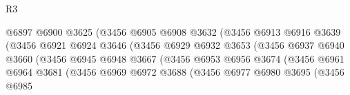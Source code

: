 \begin{lexlean}{R3}
\begin{coremodule}
                                          @6897
                                          @6900
                                          @3625
                                          (@3456
                                            @6905
                                            @6908
                                            @3632
                                            (@3456
                                              @6913
                                              @6916
                                              @3639
                                              (@3456
                                                @6921
                                                @6924
                                                @3646
                                                (@3456
                                                  @6929
                                                  @6932
                                                  @3653
                                                  (@3456
                                                    @6937
                                                    @6940
                                                    @3660
                                                    (@3456
                                                      @6945
                                                      @6948
                                                      @3667
                                                      (@3456
                                                        @6953
                                                        @6956
                                                        @3674
                                                        (@3456
                                                          @6961
                                                          @6964
                                                          @3681
                                                          (@3456
                                                            @6969
                                                            @6972
                                                            @3688
                                                            (@3456
                                                              @6977
                                                              @6980
                                                              @3695
                                                              (@3456
                                                                @6985

\end{coremodule}
\end{lexlean}
